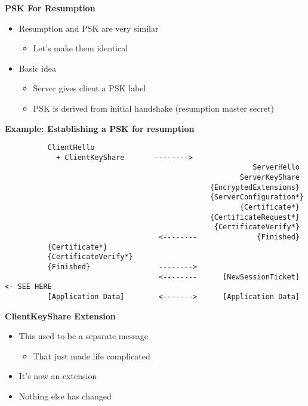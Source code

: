 \documentclass[helvetica]{seminar}
\newcommand{\heading}[1]{%
  \begin{center} 
    \large\bf 
    #1 
  \end{center} 
  \vspace{.4 in}}
\begin{document}
\begin{slide}
\heading{PSK For Resumption}

\begin{itemize}
\item Resumption and PSK are very similar
  \begin{itemize}
  \item Let's make them identical
  \end{itemize}

\item Basic idea
  \begin{itemize}
  \item Server gives client a PSK label
  \item PSK is derived from initial handshake (resumption master secret)
  \end{itemize}
\end{itemize}
\end{slide}


\begin{slide}
\heading{Example: Establishing a PSK for resumption}

\begin{footnotesize}
\begin{verbatim}
          ClientHello
            + ClientKeyShare       -------->
                                                          ServerHello
                                                       ServerKeyShare
                                                {EncryptedExtensions}
                                                {ServerConfiguration*}
                                                       {Certificate*}
                                                {CertificateRequest*}
                                                 {CertificateVerify*}
                                    <--------              {Finished}
          {Certificate*}
          {CertificateVerify*}
          {Finished}                -------->
                                    <--------      [NewSessionTicket] <- SEE HERE
          [Application Data]        <------->      [Application Data]
\end{verbatim}
\end{footnotesize}
\end{slide}


\begin{slide}
\heading{ClientKeyShare Extension}

\begin{itemize}
\item This used to be a separate message
  \begin{itemize}
  \item That just made life complicated
  \end{itemize}

\item It's now an extension
\item Nothing else has changed
\end{itemize}
\end{slide}
\end{document}
